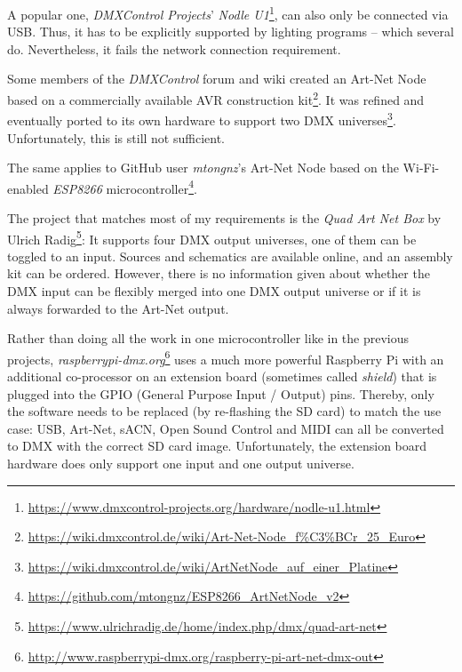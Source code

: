 A popular one, \emph{DMXControl Projects}' \emph{Nodle U1}\footnote{\url{https://www.dmxcontrol-projects.org/hardware/nodle-u1.html}},
can also only be connected via USB. Thus, it has to be explicitly
supported by lighting programs -- which several do. Nevertheless, it
fails the network connection requirement.

Some members of the \emph{DMXControl} forum and wiki created an Art-Net
Node based on a commercially available AVR construction kit\footnote{\url{https://wiki.dmxcontrol.de/wiki/Art-Net-Node_f\%C3\%BCr_25_Euro}}.
It was refined and eventually ported to its own hardware to support two
DMX universes\footnote{\url{https://wiki.dmxcontrol.de/wiki/ArtNetNode_auf_einer_Platine}}.
Unfortunately, this is still not sufficient.

The same applies to GitHub user \emph{mtongnz}'s Art-Net Node based on
the Wi-Fi-enabled \emph{ESP8266} microcontroller\footnote{\url{https://github.com/mtongnz/ESP8266_ArtNetNode_v2}}.

The project that matches most of my requirements is the \emph{Quad Art
Net Box} by Ulrich Radig\footnote{\url{https://www.ulrichradig.de/home/index.php/dmx/quad-art-net}}:
It supports four DMX output universes, one of them can be toggled to an
input. Sources and schematics are available online, and an assembly kit
can be ordered. However, there is no information given about whether the
DMX input can be flexibly merged into one DMX output universe or if it
is always forwarded to the Art-Net output.

Rather than doing all the work in one microcontroller like in the
previous projects, \emph{raspberrypi-dmx.org}\footnote{\url{http://www.raspberrypi-dmx.org/raspberry-pi-art-net-dmx-out}}
uses a much more powerful Raspberry Pi with an additional co-processor
on an extension board (sometimes called \emph{shield}) that is plugged
into the GPIO (General Purpose Input / Output) pins. Thereby, only the
software needs to be replaced (by re-flashing the SD card) to match the
use case: USB, Art-Net, sACN, Open Sound Control and MIDI can all be
converted to DMX with the correct SD card image. Unfortunately, the
extension board hardware does only support one input and one output
universe.

